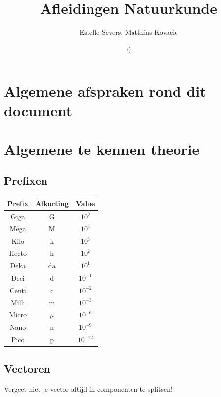 \documentclass[12pt,a4paper]{article}
\author{Estelle Severs, Matthias Kovacic}
\title{Afleidingen Natuurkunde}
\date{:)}
\begin{document}
    \maketitle
    \tableofcontents
    \newpage


    \section{Algemene afspraken rond dit document}


    \section{Algemene te kennen theorie}

    \subsection{Prefixen}
    \begin{center}
        \begin{tabular}{ | c | c | c | }
            \hline
            Prefix & Afkorting & Value      \\
            \hline
            Giga   & G         & $10^{9}$   \\
            Mega   & M         & $10^{6}$   \\
            Kilo   & k         & $10^{3}$   \\
            Hecto  & h         & $10^{2}$   \\
            Deka   & da        & $10^{1}$   \\
            Deci   & d         & $10^{-1}$  \\
            Centi  & c         & $10^{-2}$  \\
            Milli  & m         & $10^{-3}$  \\
            Micro  & $\mu$     & $10^{-6}$  \\
            Nano   & n         & $10^{-9}$  \\
            Pico   & p         & $10^{-12}$ \\
            \hline
        \end{tabular}
    \end{center}

    \subsection{Vectoren}
    Vergeet niet je vector altijd in componenten te splitsen!
\end{document}
